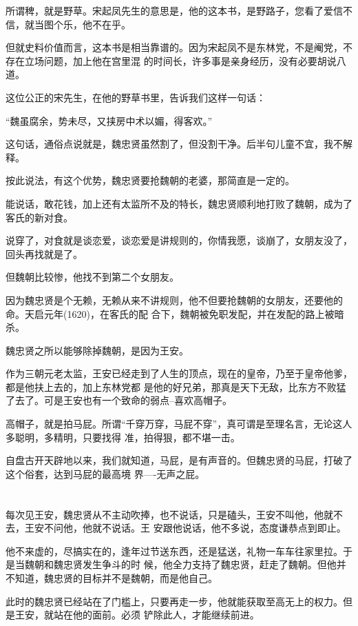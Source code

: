 \documentclass[11pt,a4paper,onecolumn]{article}
\begin{document}
所谓稗，就是野草。宋起凤先生的意思是，他的这本书，是野路子，您看了爱信不信，就当图个乐，他不在乎。

但就史料价值而言，这本书是相当靠谱的。因为宋起凤不是东林党，不是阉党，不存在立场问题，加上他在宫里混
的时间长，许多事是亲身经历，没有必要胡说八道。

这位公正的宋先生，在他的野草书里，告诉我们这样一句话：

``魏虽腐余，势未尽，又挟房中术以媚，得客欢。''

这句话，通俗点说就是，魏忠贤虽然割了，但没割干净。后半句儿童不宜，我不解释。

按此说法，有这个优势，魏忠贤要抢魏朝的老婆，那简直是一定的。

能说话，敢花钱，加上还有太监所不及的特长，魏忠贤顺利地打败了魏朝，成为了客氏的新对食。

说穿了，对食就是谈恋爱，谈恋爱是讲规则的，你情我愿，谈崩了，女朋友没了，回头再找就是了。

但魏朝比较惨，他找不到第二个女朋友。

因为魏忠贤是个无赖，无赖从来不讲规则，他不但要抢魏朝的女朋友，还要他的命。天启元年(1620)，在客氏的配
合下，魏朝被免职发配，并在发配的路上被暗杀。

魏忠贤之所以能够除掉魏朝，是因为王安。

作为三朝元老太监，王安已经走到了人生的顶点，现在的皇帝，乃至于皇帝他爹，都是他扶上去的，加上东林党都
是他的好兄弟，那真是天下无敌，比东方不败猛了去了。可是王安也有一个致命的弱点--喜欢高帽子。

高帽子，就是拍马屁。所谓``千穿万穿，马屁不穿''，真可谓是至理名言，无论这人多聪明，多精明，只要找得
准，拍得狠，都不堪一击。

自盘古开天辟地以来，我们就知道，马屁，是有声音的。但魏忠贤的马屁，打破了这个俗套，达到马屁的最高境
界----无声之屁。

\section[\thesection]{}

每次见王安，魏忠贤从不主动吹捧，也不说话，只是磕头，王安不叫他，他就不去，王安不问他，他就不说话。王
安跟他说话，他不多说，态度谦恭点到即止。

他不来虚的，尽搞实在的，逢年过节送东西，还是猛送，礼物一车车往家里拉。于是当魏朝和魏忠贤发生争斗的时
候，他全力支持了魏忠贤，赶走了魏朝。但他并不知道，魏忠贤的目标并不是魏朝，而是他自己。

此时的魏忠贤已经站在了门槛上，只要再走一步，他就能获取至高无上的权力。但是王安，就站在他的面前。必须
铲除此人，才能继续前进。
\end{document}

